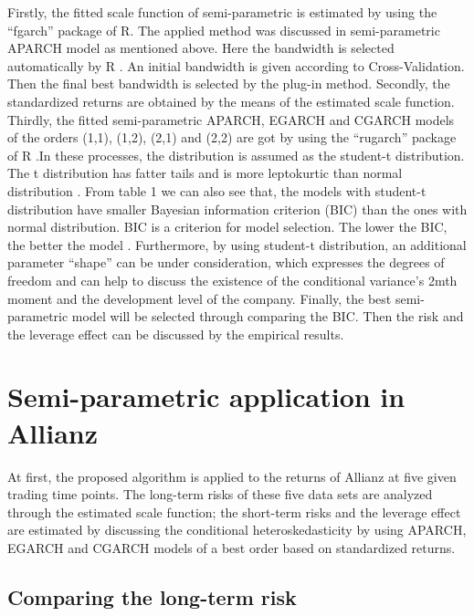 Firstly, the fitted scale function of semi-parametric is estimated by using the ``fgarch'' package of R. The applied method was discussed in semi-parametric APARCH model as mentioned above. Here the bandwidth is selected automatically by R \citep{Wuertz2013}. An initial bandwidth is given according to Cross-Validation. Then the final best bandwidth is selected by the plug-in method. Secondly, the standardized returns are obtained by the means of the estimated scale function. Thirdly, the fitted semi-parametric APARCH, EGARCH and CGARCH models of the orders  (1,1), (1,2), (2,1) and (2,2) are got by using the ``rugarch'' package of R
 \citep{Ghalanos2014a}.In these processes, the distribution is assumed as the student-t distribution. The t distribution has fatter tails and is more leptokurtic than normal distribution \citep{Pollard1998}. From table 1 we can also see that, the models with student-t distribution have smaller Bayesian information criterion (BIC) than the ones with normal distribution. BIC is a criterion for model selection. The lower the BIC, the better the model \citep{Schwarz1978}. Furthermore, by using student-t distribution, an additional parameter ``shape'' can be under consideration, which expresses the degrees of freedom and can help to discuss the existence of the conditional variance’s 2mth moment and the development level of the company. Finally, the best semi-parametric model will be selected through comparing the BIC. Then the risk and the leverage effect can be discussed by the empirical results.


\section{Semi-parametric application in Allianz}

At first, the proposed algorithm is applied to the returns of Allianz at five given trading time points. The long-term risks of these five data sets are analyzed through the estimated scale function; the short-term risks and the leverage effect are estimated by discussing the conditional heteroskedasticity by using APARCH, EGARCH and CGARCH models of a best order based on standardized returns. 


\subsection{Comparing the long-term risk}

